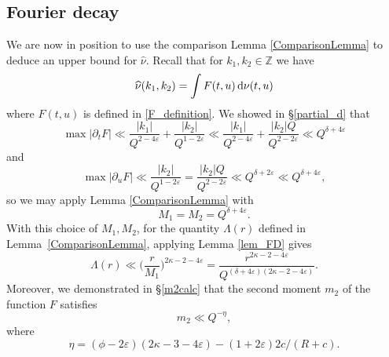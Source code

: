 \documentclass[12pt, reqno]{amsart}
\theoremstyle{definition}
\theoremstyle{remark}
\numberwithin{equation}{section}
\def\kap{{\kappa}}
\def\eps{\varepsilon}
\def\d{{\,{\rm d}}}
\begin{document}
\subsection{Fourier decay} 

We are now in position to use the comparison Lemma \ref{ComparisonLemma} to deduce an upper bound for $\widehat{\nu}.$  Recall that for $k_1, k_2 \in \mathbb{Z}$ we have 
\[ \widehat{\nu}(k_1,k_2) = \int F(t,u)\d \nu(t,u)  
\]
where $F(t,u)$ is defined in \eqref{F_definition}. We showed in \S \ref{partial_d} that 
\[  
\max |\partial_t F| \ll \frac{|k_1|}{Q^{2-4\varepsilon}} + \frac{|k_2|}{Q^{1-2\varepsilon}} \ll \frac{|k_1|}{Q^{2-4\varepsilon}} + \frac{|k_2|Q}{Q^{2-2\varepsilon}} \ll Q^{\delta + 4\varepsilon} 
\] 
and  
\[    \max |\partial_u F| \ll \frac{|k_2|}{Q^{1-2\varepsilon}} =  \frac{|k_2|Q}{Q^{2-2\varepsilon}} \ll  Q^{\delta+2\varepsilon}  \ll Q^{\delta + 4 \varepsilon},
\] 
so we may apply Lemma \ref{ComparisonLemma} with 
\[ 
M_1 = M_2 = 
Q^{\delta + 4\varepsilon}.  
\]
With this choice of $M_1, M_2$, for the quantity $\Lambda(r)$ defined in Lemma~\ref{ComparisonLemma}, applying Lemma \ref{lem_FD} gives
\[ 
\Lambda(r) \ll \Big( \frac{r}{M_1}\Big)^{2\kappa -2 -4\varepsilon} = \frac{r^{2\kappa-2-4\varepsilon}}{Q^{(\delta+4\varepsilon)(2\kappa-2 -4\varepsilon)}}.
\]
Moreover, we demonstrated in \S \ref{m2calc} that the second moment 
$m_2$ of the function $F$ satisfies 
\[ 
m_2 \ll Q^{-\eta},
\]
where
\[
\eta = (\phi - 2\eps)
(2 \kap - 3 - 4\eps)
- (1 + 2\eps) 2c / (R+c).
\]
\end{document}
